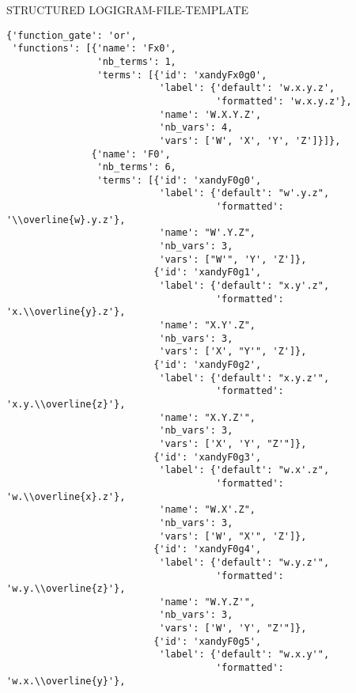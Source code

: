 




STRUCTURED LOGIGRAM-FILE-TEMPLATE

\begin{verbatim}
{'function_gate': 'or',
 'functions': [{'name': 'Fx0',
                'nb_terms': 1,
                'terms': [{'id': 'xandyFx0g0',
                           'label': {'default': 'w.x.y.z',
                                     'formatted': 'w.x.y.z'},
                           'name': 'W.X.Y.Z',
                           'nb_vars': 4,
                           'vars': ['W', 'X', 'Y', 'Z']}]},
               {'name': 'F0',
                'nb_terms': 6,
                'terms': [{'id': 'xandyF0g0',
                           'label': {'default': "w'.y.z",
                                     'formatted': '\\overline{w}.y.z'},
                           'name': "W'.Y.Z",
                           'nb_vars': 3,
                           'vars': ["W'", 'Y', 'Z']},
                          {'id': 'xandyF0g1',
                           'label': {'default': "x.y'.z",
                                     'formatted': 'x.\\overline{y}.z'},
                           'name': "X.Y'.Z",
                           'nb_vars': 3,
                           'vars': ['X', "Y'", 'Z']},
                          {'id': 'xandyF0g2',
                           'label': {'default': "x.y.z'",
                                     'formatted': 'x.y.\\overline{z}'},
                           'name': "X.Y.Z'",
                           'nb_vars': 3,
                           'vars': ['X', 'Y', "Z'"]},
                          {'id': 'xandyF0g3',
                           'label': {'default': "w.x'.z",
                                     'formatted': 'w.\\overline{x}.z'},
                           'name': "W.X'.Z",
                           'nb_vars': 3,
                           'vars': ['W', "X'", 'Z']},
                          {'id': 'xandyF0g4',
                           'label': {'default': "w.y.z'",
                                     'formatted': 'w.y.\\overline{z}'},
                           'name': "W.Y.Z'",
                           'nb_vars': 3,
                           'vars': ['W', 'Y', "Z'"]},
                          {'id': 'xandyF0g5',
                           'label': {'default': "w.x.y'",
                                     'formatted': 'w.x.\\overline{y}'},

\end{verbatim}
